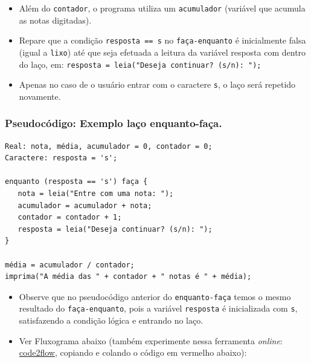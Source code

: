 \documentclass[12pt,a4paper]{article}
\providecommand{\tightlist}{%
      \setlength{\itemsep}{0pt}\setlength{\parskip}{0pt}}
\begin{document}
    \begin{itemize}
\item
  Além do \texttt{contador}, o programa utiliza um \texttt{acumulador}
  (variável que acumula as notas digitadas).
\item
  Repare que a condição
  \texttt{resposta\ ==\ \textquotesingle{}s\textquotesingle{}} no
  \texttt{faça-enquanto} é inicialmente falsa (igual a
  \texttt{\textquotesingle{}lixo\textquotesingle{}}) até que seja
  efetuada a leitura da variável resposta com dentro do laço, em:
  \texttt{resposta\ =\ leia("Deseja\ continuar?\ (s/n):\ ");}
\item
  Apenas no caso de o usuário entrar com o caractere
  \texttt{\textquotesingle{}s\textquotesingle{}}, o laço será repetido
  novamente.
\end{itemize}

    \hypertarget{pseudocuxf3digo-exemplo-lauxe7o-enquanto-fauxe7a.}{%
\subsubsection{Pseudocódigo: Exemplo laço
enquanto-faça.}\label{pseudocuxf3digo-exemplo-lauxe7o-enquanto-fauxe7a.}}

\begin{verbatim}
Real: nota, média, acumulador = 0, contador = 0;
Caractere: resposta = 's';

enquanto (resposta == 's') faça {
   nota = leia("Entre com uma nota: ");
   acumulador = acumulador + nota;
   contador = contador + 1;
   resposta = leia("Deseja continuar? (s/n): ");
}

média = acumulador / contador;
imprima("A média das " + contador + " notas é " + média);
\end{verbatim}

    \begin{itemize}
\tightlist
\item
  Observe que no pseudocódigo anterior do \texttt{enquanto-faça} temos o
  mesmo resultado do \texttt{faça-enquanto}, pois a variável
  \texttt{resposta} é inicializada com \texttt{s}, satisfazendo a
  condição lógica e entrando no laço.
\end{itemize}

    \begin{itemize}
\tightlist
\item
  Ver Fluxograma abaixo (também experimente nessa ferramenta
  \emph{online}: \href{https://app.code2flow.com/}{code2flow}, copiando
  e colando o código em vermelho abaixo):
\end{itemize}
\end{document}
